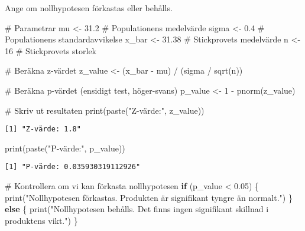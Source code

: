 \documentclass[
  letterpaper,
  DIV=11,
  numbers=noendperiod]{scrartcl}
\newenvironment{Shaded}{\begin{snugshade}}{\end{snugshade}}
\newcommand{\CommentTok}[1]{\textcolor[rgb]{0.37,0.37,0.37}{#1}}
\newcommand{\ControlFlowTok}[1]{\textcolor[rgb]{0.00,0.23,0.31}{\textbf{#1}}}
\newcommand{\DecValTok}[1]{\textcolor[rgb]{0.68,0.00,0.00}{#1}}
\newcommand{\FloatTok}[1]{\textcolor[rgb]{0.68,0.00,0.00}{#1}}
\newcommand{\FunctionTok}[1]{\textcolor[rgb]{0.28,0.35,0.67}{#1}}
\newcommand{\NormalTok}[1]{\textcolor[rgb]{0.00,0.23,0.31}{#1}}
\newcommand{\OtherTok}[1]{\textcolor[rgb]{0.00,0.23,0.31}{#1}}
\newcommand{\SpecialCharTok}[1]{\textcolor[rgb]{0.37,0.37,0.37}{#1}}
\newcommand{\StringTok}[1]{\textcolor[rgb]{0.13,0.47,0.30}{#1}}
\begin{document}
Ange om nollhypotesen förkastas eller behålls.

\begin{Shaded}
\begin{Highlighting}[]
\CommentTok{\# Parametrar}
\NormalTok{mu }\OtherTok{\textless{}{-}} \FloatTok{31.2}          \CommentTok{\# Populationens medelvärde}
\NormalTok{sigma }\OtherTok{\textless{}{-}} \FloatTok{0.4}        \CommentTok{\# Populationens standardavvikelse}
\NormalTok{x\_bar }\OtherTok{\textless{}{-}} \FloatTok{31.38}      \CommentTok{\# Stickprovets medelvärde}
\NormalTok{n }\OtherTok{\textless{}{-}} \DecValTok{16}             \CommentTok{\# Stickprovets storlek}

\CommentTok{\# Beräkna z{-}värdet}
\NormalTok{z\_value }\OtherTok{\textless{}{-}}\NormalTok{ (x\_bar }\SpecialCharTok{{-}}\NormalTok{ mu) }\SpecialCharTok{/}\NormalTok{ (sigma }\SpecialCharTok{/} \FunctionTok{sqrt}\NormalTok{(n))}

\CommentTok{\# Beräkna p{-}värdet (ensidigt test, höger{-}svans)}
\NormalTok{p\_value }\OtherTok{\textless{}{-}} \DecValTok{1} \SpecialCharTok{{-}} \FunctionTok{pnorm}\NormalTok{(z\_value)}

\CommentTok{\# Skriv ut resultaten}
\FunctionTok{print}\NormalTok{(}\FunctionTok{paste}\NormalTok{(}\StringTok{"Z{-}värde:"}\NormalTok{, z\_value))}
\end{Highlighting}
\end{Shaded}

\begin{verbatim}
[1] "Z-värde: 1.8"
\end{verbatim}

\begin{Shaded}
\begin{Highlighting}[]
\FunctionTok{print}\NormalTok{(}\FunctionTok{paste}\NormalTok{(}\StringTok{"P{-}värde:"}\NormalTok{, p\_value))}
\end{Highlighting}
\end{Shaded}

\begin{verbatim}
[1] "P-värde: 0.035930319112926"
\end{verbatim}

\begin{Shaded}
\begin{Highlighting}[]
\CommentTok{\# Kontrollera om vi kan förkasta nollhypotesen}
\ControlFlowTok{if}\NormalTok{ (p\_value }\SpecialCharTok{\textless{}} \FloatTok{0.05}\NormalTok{) \{}
  \FunctionTok{print}\NormalTok{(}\StringTok{"Nollhypotesen förkastas. Produkten är signifikant tyngre än normalt."}\NormalTok{)}
\NormalTok{\} }\ControlFlowTok{else}\NormalTok{ \{}
  \FunctionTok{print}\NormalTok{(}\StringTok{"Nollhypotesen behålls. Det finns ingen signifikant skillnad i produktens vikt."}\NormalTok{)}
\NormalTok{\}}
\end{Highlighting}
\end{Shaded}
\end{document}
